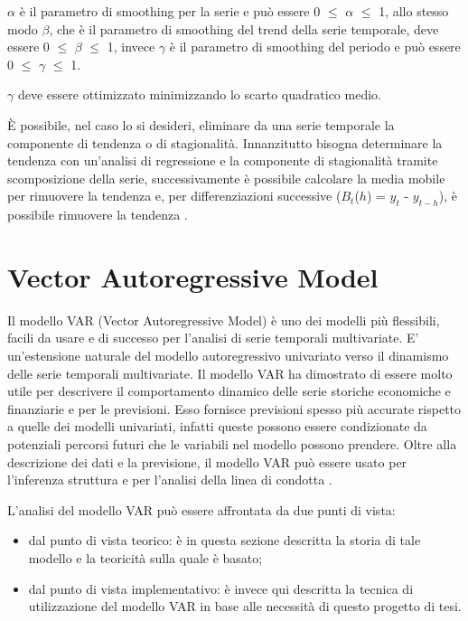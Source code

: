 \documentclass[12pt,a4paper,oneside,openright]{book}
\begin{document}
$\alpha$ è il parametro di smoothing per la serie e può essere 0 $\leq$ $\alpha$ $\leq$ 1, allo stesso modo $\beta$, che è il parametro di smoothing del trend della serie temporale, deve essere 0 $\leq$ $\beta$ $\leq$ 1, invece $\gamma$ è il parametro di smoothing del periodo e può essere 0 $\leq$ $\gamma$ $\leq$ 1. 

$\gamma$ deve essere ottimizzato minimizzando lo scarto quadratico medio.

\medskip \medskip

È possibile, nel caso lo si desideri, eliminare da una serie temporale la componente di tendenza o di stagionalità.
Innanzitutto bisogna determinare la tendenza con un'analisi di regressione e la componente di stagionalità tramite scomposizione della serie, successivamente è possibile calcolare la media mobile per rimuovere la tendenza e, per differenziazioni successive ($B_{t}$($h$) = $y_{t}$ - $y_{t-h}$), è possibile rimuovere la tendenza \cite{8a}.

\newpage
\section{Vector Autoregressive Model}
Il modello VAR (Vector Autoregressive Model) è uno dei modelli  più flessibili, facili da usare e di successo per l'analisi di serie temporali multivariate. E' un'estensione naturale del modello autoregressivo univariato verso il dinamismo delle serie temporali multivariate. Il modello VAR ha dimostrato di essere molto utile per descrivere il comportamento dinamico delle serie storiche economiche e finanziarie e per le previsioni. Esso fornisce previsioni spesso più accurate rispetto a quelle dei modelli univariati, infatti queste possono essere condizionate da potenziali percorsi futuri che le variabili nel modello possono prendere. Oltre alla descrizione dei dati e la previsione, il modello VAR può essere usato per l'inferenza struttura e per l'analisi della linea di condotta \cite{13a}. 

L'analisi del modello VAR può essere affrontata da due punti di vista: 
\begin{itemize}
\item dal punto di vista teorico: è in questa sezione descritta la storia di tale modello e la teoricità sulla quale è basato;
\item dal punto di vista implementativo: è invece qui descritta la tecnica di utilizzazione del modello VAR in base alle necessità di questo progetto di tesi.
\end{itemize}
\newpage 
\end{document}
